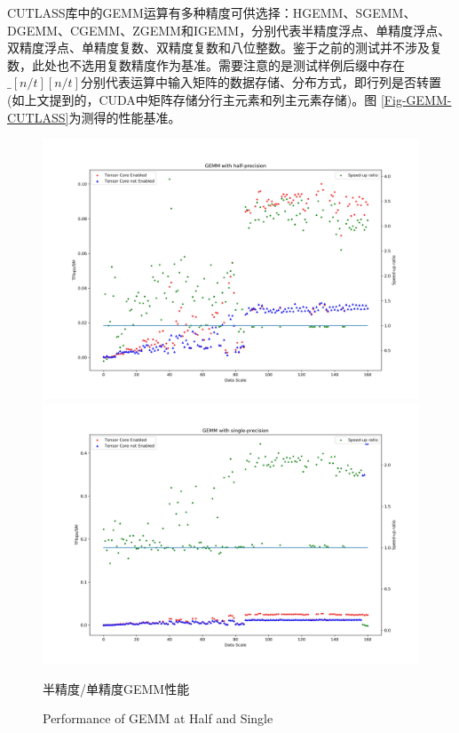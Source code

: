 \par CUTLASS库中的GEMM运算有多种精度可供选择：HGEMM、SGEMM、DGEMM、CGEMM、ZGEMM和IGEMM，分别代表半精度浮点、单精度浮点、双精度浮点、单精度复数、双精度复数和八位整数。鉴于之前的测试并不涉及复数，此处也不选用复数精度作为基准。需要注意的是测试样例后缀中存在$ \_[n/t][n/t] $分别代表运算中输入矩阵的数据存储、分布方式，即行列是否转置(如上文提到的，CUDA中矩阵存储分行主元素和列主元素存储)。图 \ref{Fig-GEMM-CUTLASS}为测得的性能基准。
\begin{figure}
	\centering
	\includegraphics[width=15cm]{figures/GEMM-Half-TF.jpg}\\
	\includegraphics[width=15cm]{figures/GEMM-Single-TF.jpg}
	\renewcommand{\thefigure}{\arabic{section}-\arabic{figure} }
	\renewcommand{\figurename}{图}
	\caption{半精度/单精度GEMM性能}
	\addtocounter{figure}{-1}
	\renewcommand{\thefigure}{\arabic{section}-\arabic{figure} }
	\renewcommand{\figurename}{Figure}
	\caption{Performance of GEMM at Half and Single}
	\label{Fig-PerfGemm}
\end{figure}
